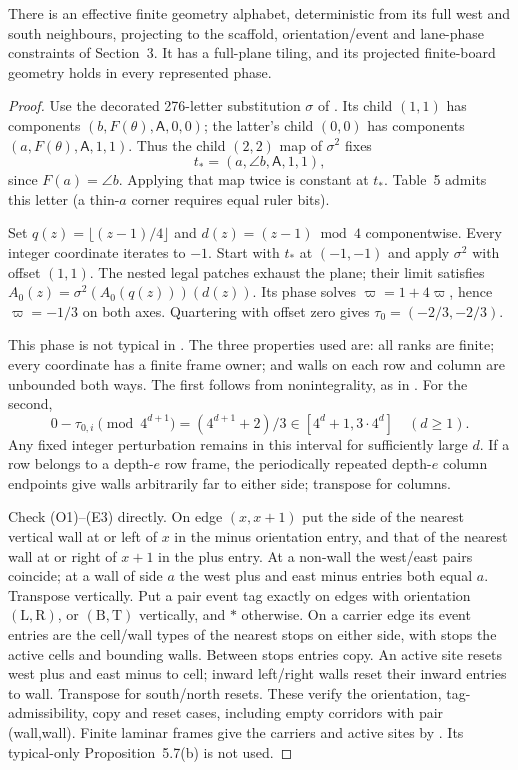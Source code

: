 \begin{lemma}\label{lem:three-cover}
There is an effective finite geometry alphabet, deterministic from its full west and south neighbours, projecting to the scaffold, orientation/event and lane-phase constraints of Section~3. It has a full-plane tiling, and its projected finite-board geometry holds in every represented phase.
\end{lemma}
\begin{proof}
Use the decorated 276-letter substitution $\sigma$ of \cite[Tables~4--5]{DMhard}. Its child $(1,1)$ has components $(b,F(\theta),\mathsf A,0,0)$; the latter's child $(0,0)$ has components $(a,F(\theta),\mathsf A,1,1)$. Thus the child $(2,2)$ map of $\sigma^2$ fixes
\[
 t_*=(a,\angle b,\mathsf A,1,1),
\]
since $F(a)=\angle b$. Applying that map twice is constant at $t_*$. Table~5 admits this letter (a thin-$a$ corner requires equal ruler bits).

Set $q(z)=\lfloor(z-1)/4\rfloor$ and $d(z)=(z-1)\bmod4$ componentwise. Every integer coordinate iterates to $-1$. Start with $t_*$ at $(-1,-1)$ and apply $\sigma^2$ with offset $(1,1)$. The nested legal patches exhaust the plane; their limit satisfies $A_0(z)=\sigma^2(A_0(q(z)))(d(z))$. Its phase solves $\varpi=1+4\varpi$, hence $\varpi=-1/3$ on both axes. Quartering with offset zero gives $\tau_0=(-2/3,-2/3)$.

This phase is not typical in \cite[Definition~3.15]{DMhard}. The three properties used are: all ranks are finite; every coordinate has a finite frame owner; and walls on each row and column are unbounded both ways. The first follows from nonintegrality, as in \cite[Lemma~3.14]{DMhard}. For the second,
\[
 0-\tau_{0,i}\pmod{4^{d+1}}=(4^{d+1}+2)/3
       \in[4^d+1,3\cdot4^d]\quad(d\ge1).
\]
Any fixed integer perturbation remains in this interval for sufficiently large $d$. If a row belongs to a depth-$e$ row frame, the periodically repeated depth-$e$ column endpoints give walls arbitrarily far to either side; transpose for columns.

Check (O1)--(E3) directly. On edge $(x,x+1)$ put the side of the nearest vertical wall at or left of $x$ in the minus orientation entry, and that of the nearest wall at or right of $x+1$ in the plus entry. At a non-wall the west/east pairs coincide; at a wall of side $a$ the west plus and east minus entries both equal $a$. Transpose vertically. Put a pair event tag exactly on edges with orientation $(\mathrm L,\mathrm R)$, or $(\mathrm B,\mathrm T)$ vertically, and $*$ otherwise. On a carrier edge its event entries are the cell/wall types of the nearest stops on either side, with stops the active cells and bounding walls. Between stops entries copy. An active site resets west plus and east minus to cell; inward left/right walls reset their inward entries to wall. Transpose for south/north resets. These verify the orientation, tag-admissibility, copy and reset cases, including empty corridors with pair (wall,wall). Finite laminar frames give the carriers and active sites by \cite[Lemma~3.13, Lemma~A.8 and Proposition~5.1(b,c)]{DMhard}. Its typical-only Proposition~5.7(b) is not used.


\end{proof}

